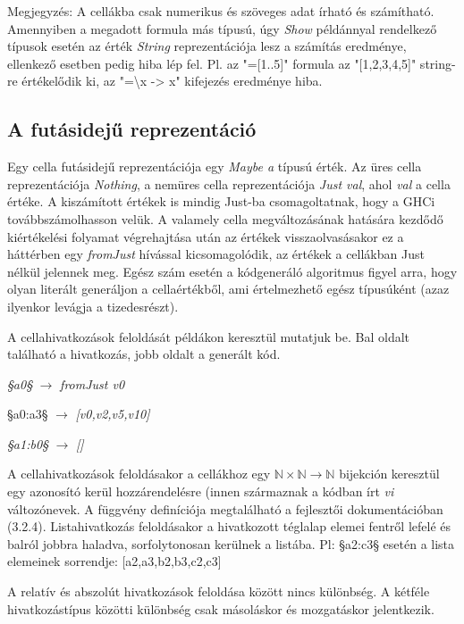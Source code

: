 Megjegyzés: A cellákba csak numerikus és szöveges adat írható és számítható. Amennyiben a megadott formula más típusú, úgy \textit{Show} példánnyal rendelkező típusok esetén az érték \textit{String} reprezentációja lesz a számítás eredménye, ellenkező esetben pedig hiba lép fel. Pl. az "=[1..5]" formula az "[1,2,3,4,5]" string-re értékelődik ki, az "=\textbackslash x -> x" kifejezés eredménye hiba.

\subsection{A futásidejű reprezentáció}

Egy cella futásidejű reprezentációja egy \textit{Maybe a} típusú érték. Az üres cella reprezentációja \textit{Nothing}, a nemüres cella reprezentációja \textit{Just val}, ahol \textit{val} a cella értéke. A kiszámított értékek is mindig Just-ba csomagoltatnak, hogy a GHCi továbbszámolhasson velük. A valamely cella megváltozásának hatására kezdődő kiértékelési folyamat végrehajtása után az értékek visszaolvasásakor ez a háttérben egy \textit{fromJust} hívással kicsomagolódik, az értékek a cellákban Just nélkül jelennek meg.
Egész szám esetén a kódgeneráló algoritmus figyel arra, hogy olyan literált generáljon a cellaértékből, ami értelmezhető egész típusúként (azaz ilyenkor levágja a tizedesrészt).

A cellahivatkozások feloldását példákon keresztül mutatjuk be. Bal oldalt található a hivatkozás, jobb oldalt a generált kód.
\begin{compactenum}
	\item \textit{§a0§} $\rightarrow$ \textit{fromJust v0}
	\item §a0:a3§ $\rightarrow$ \textit{[v0,v2,v5,v10]}
	\item \textit{§a1:b0§} $\rightarrow$ \textit{[]}
\end{compactenum}

A cellahivatkozások feloldásakor a cellákhoz egy $\mathbb{N} \times \mathbb{N} \rightarrow \mathbb{N}$ bijekción keresztül egy azonosító kerül hozzárendelésre (innen származnak a kódban írt \textit{vi} változónevek. A függvény definíciója megtalálható a fejlesztői dokumentációban (3.2.4). Listahivatkozás feloldásakor a hivatkozott téglalap elemei fentről lefelé és balról jobbra haladva, sorfolytonosan kerülnek a listába. Pl: §a2:c3§ esetén a lista elemeinek sorrendje: [a2,a3,b2,b3,c2,c3]

A relatív és abszolút hivatkozások feloldása között nincs különbség. A kétféle hivatkozástípus közötti különbség csak másoláskor és mozgatáskor jelentkezik.

